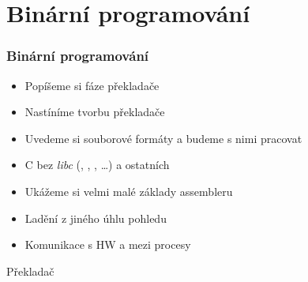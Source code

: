 \section{Binární programování}
\frame{\sectionpage}

\begin{frame}
  \frametitle{Binární programování}

  \begin{itemize}
    \item Popíšeme si fáze překladače
    \item Nastíníme tvorbu překladače
    \item Uvedeme si souborové formáty a budeme s nimi pracovat
    \item C bez \emph{libc} (, , ,
      \dots) a ostatních
    \item Ukážeme si velmi malé základy assembleru
    \item Ladění z jiného úhlu pohledu
    \item Komunikace s HW \iffimuni a mezi procesy\fi
  \end{itemize}

   \fi

\end{frame}

\begin{frame}[fragile]{Překladač}

  \begin{center}
    
  \end{center}

\end{frame}

